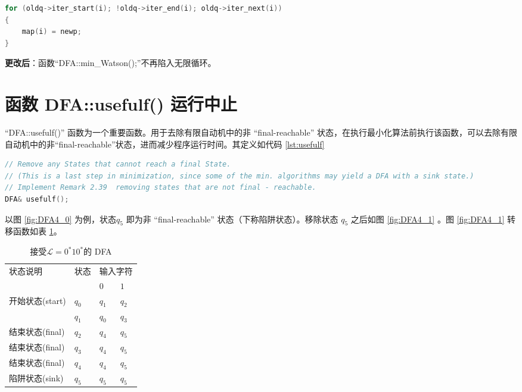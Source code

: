 \begin{lstlisting}[language=C++,label={lst:StateEqRel2},caption={StateEqRel.cpp}]
for (oldq->iter_start(i); !oldq->iter_end(i); oldq->iter_next(i))
{
    map(i) = newp;
}
\end{lstlisting}

{\bfseries 更改后}：函数“DFA::min\_Watson();”不再陷入无限循环。


\section{函数 DFA::usefulf() 运行中止}\label{sec:usefulf}

“DFA::usefulf()” 函数为一个重要函数。用于去除有限自动机中的非 “final-reachable” 状态，在执行最小化算法前执行该函数，可以去除有限自动机中的非“final-reachable”状态，进而减少程序运行时间。其定义如代码 \ref{lst:usefulf}

\begin{lstlisting}[language=C++,label={lst:usefulf},caption={DFA::usefulf()}]
// Remove any States that cannot reach a final State.
// (This is a last step in minimization, since some of the min. algorithms may yield a DFA with a sink state.)
// Implement Remark 2.39  removing states that are not final - reachable.
DFA& usefulf();
\end{lstlisting}
以图 \ref{fig:DFA4_0} 为例，状态$q_5$ 即为非 “final-reachable” 状态（下称陷阱状态）。移除状态 $q_5$ 之后如图 \ref{fig:DFA4_1} 。图 \ref{fig:DFA4_1} 转移函数如表 \ref{tab:DFA4_1}。

\begin{table}[!htbp]
    \caption{接受{$\mathcal{L}=0^*10^*$}的 DFA{\cite{book1}}}
    \label{tab:DFA4_1}
    \centering
    \small%
    \setlength{\tabcolsep}{4pt}%
    \renewcommand{\arraystretch}{1.2}%
        \begin{tabular}{l p{4em}<{\centering} p{3em}<{\centering} p{3em}<{\centering}}
        \toprule %
        \multirow{2}{*}{状态说明} & \multirow{2}{*}{状态} & \multicolumn{2}{c}{输入字符} \\
		\cline{3-4}      &    &$0$ & $1$  \\
        \midrule%
        开始状态(start)  & $q_0$ & $q_1$   & $q_2$   \\
                        & $q_1$ & $q_0$   & $q_3$   \\
        结束状态(final) & $q_2$ & $q_4$   & $q_5$   \\
        结束状态(final) & $q_3$ & $q_4$   & $q_5$   \\
        结束状态(final) & $q_4$ & $q_4$   & $q_5$   \\
        陷阱状态(sink) & $q_5$ & $q_5$   & $q_5$   \\
        \bottomrule%
    \end{tabular}
\end{table}

